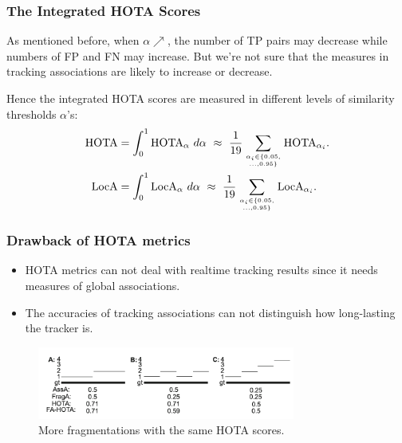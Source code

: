 \documentclass[slidetop, mathserif, dvipsnames]{beamer}
\begin{document}
\begin{frame}
	\frametitle{The Integrated HOTA Scores}

	As mentioned before, when $\alpha\nearrow$,
	the number of TP pairs may decrease while numbers of FP and FN may increase.
	But we're not sure that
	the measures in tracking associations are likely to increase or decrease.

	\quad

	Hence the integrated HOTA scores are measured in different levels of
	similarity thresholds $\alpha$'s:
	\begin{align*}
		\text{HOTA} & = \int_0^1\text{HOTA}_\alpha\ d\alpha
		~ \approx ~ \dfrac1{19}\sum_{\alpha_i\in\{0.05,\atop \ldots,0.95\}}
		\text{HOTA}_{\alpha_i}. \\
		\text{LocA} & = \int_0^1\text{LocA}_\alpha\ d\alpha
		~ \approx ~ \dfrac1{19}\sum_{\alpha_i\in\{0.05,\atop \ldots,0.95\}}
		\text{LocA}_{\alpha_i}.
	\end{align*}
\end{frame}

\begin{frame}
	\frametitle{Drawback of HOTA metrics}
	
	\begin{itemize}
	\item HOTA metrics can not deal with realtime tracking results
		since it needs measures of global associations.
	\item The accuracies of tracking associations can not distinguish
		how long-lasting the tracker is.
	\end{itemize}

	\begin{figure}
		\includegraphics[width=240pt]{pics/track05.png}
		\caption{More fragmentations with the same HOTA scores.}
	\end{figure}

\end{frame}
\end{document}

